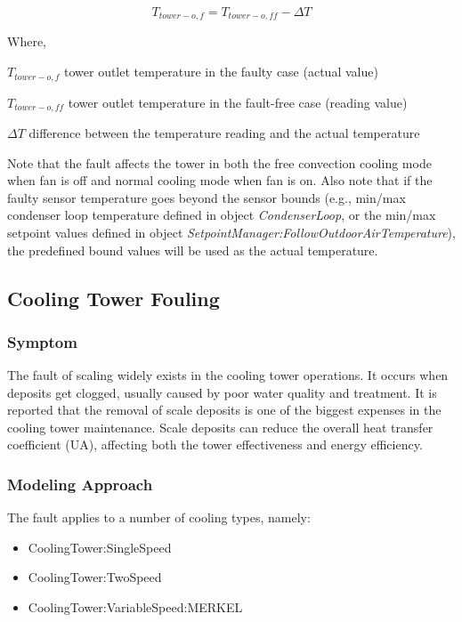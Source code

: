 \begin{equation}
T_{tower-o,f} = T_{tower-o,ff} - \Delta T
\end{equation}

Where,

\(T_{tower-o,f}\) tower outlet temperature in the faulty case (actual value)

\(T_{tower-o,ff}\) tower outlet temperature in the fault-free case (reading value)

\(\Delta T\) difference between the temperature reading and the actual temperature

Note that the fault affects the tower in both the free convection cooling mode when fan is off and normal cooling mode when fan is on. Also note that if the faulty sensor temperature goes beyond the sensor bounds (e.g., min/max condenser loop temperature defined in object \emph{CondenserLoop}, or the min/max setpoint values defined in object \emph{SetpointManager:FollowOutdoorAirTemperature}), the predefined bound values will be used as the actual temperature.


\subsection{Cooling Tower Fouling}\label{cooling-tower-fouling}

\subsubsection{Symptom}

The fault of scaling widely exists in the cooling tower operations. It occurs when deposits get clogged, usually caused by poor water quality and treatment. It is reported that the removal of scale deposits is one of the biggest expenses in the cooling tower maintenance. Scale deposits can reduce the overall heat transfer coefficient (UA), affecting both the tower effectiveness and energy efficiency.

\subsubsection{Modeling Approach}

The fault applies to a number of cooling types, namely:

\begin{itemize}
\tightlist
\item
  CoolingTower:SingleSpeed
\item
  CoolingTower:TwoSpeed
\item
  CoolingTower:VariableSpeed:MERKEL
\end{itemize}

